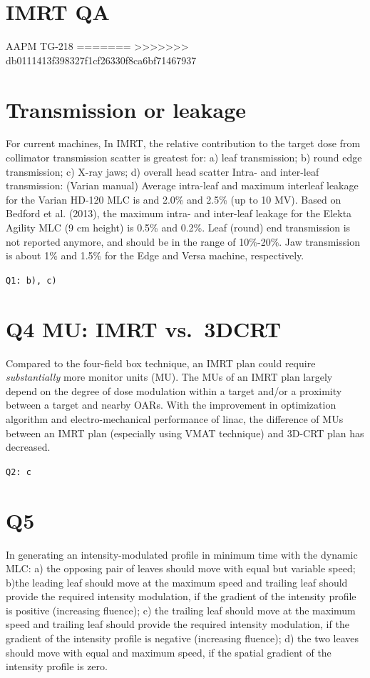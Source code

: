 \documentclass[]{book}
\theoremstyle{definition}
\theoremstyle{definition}
\theoremstyle{definition}
\theoremstyle{remark}
\begin{document}
\section{IMRT QA}\label{psqa}

AAPM TG-218
=======
>>>>>>> db0111413f398327f1cf26330f8ca6bf71467937

\section{Transmission or leakage}\label{transmission-or-leakage}

For current machines, In IMRT, the relative contribution to the target
dose from collimator transmission scatter is greatest for: a) leaf
transmission; b) round edge transmission; c) X-ray jaws; d) overall head
scatter Intra- and inter-leaf transmission: (Varian manual) Average
intra-leaf and maximum interleaf leakage for the Varian HD-120 MLC is
and 2.0\% and 2.5\% (up to 10 MV). Based on Bedford et al. (2013), the
maximum intra- and inter-leaf leakage for the Elekta Agility MLC (9 cm
height) is 0.5\% and 0.2\%. Leaf (round) end transmission is not
reported anymore, and should be in the range of 10\%-20\%. Jaw
transmission is about 1\% and 1.5\% for the Edge and Versa machine,
respectively.

\texttt{Q1:\ b),\ c)}

\section{Q4 MU: IMRT vs.~3DCRT}\label{q4-mu-imrt-vs.3dcrt}

Compared to the four-field box technique, an IMRT plan could require
\emph{substantially} more monitor units (MU). The MUs of an IMRT plan
largely depend on the degree of dose modulation within a target and/or a
proximity between a target and nearby OARs. With the improvement in
optimization algorithm and electro-mechanical performance of linac, the
difference of MUs between an IMRT plan (especially using VMAT technique)
and 3D-CRT plan has decreased.

\texttt{Q2:\ c}

\section{Q5}\label{q5}

In generating an intensity-modulated profile in minimum time with the
dynamic MLC: a) the opposing pair of leaves should move with equal but
variable speed; b)the leading leaf should move at the maximum speed and
trailing leaf should provide the required intensity modulation, if the
gradient of the intensity profile is positive (increasing fluence); c)
the trailing leaf should move at the maximum speed and trailing leaf
should provide the required intensity modulation, if the gradient of the
intensity profile is negative (increasing fluence); d) the two leaves
should move with equal and maximum speed, if the spatial gradient of the
intensity profile is zero.
\end{document}
